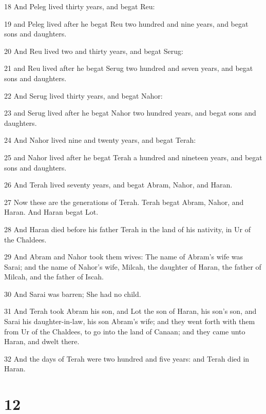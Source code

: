 \par 18 And Peleg lived thirty years, and begat Reu:
\par 19 and Peleg lived after he begat Reu two hundred and nine years, and begat sons and daughters.
\par 20 And Reu lived two and thirty years, and begat Serug:
\par 21 and Reu lived after he begat Serug two hundred and seven years, and begat sons and daughters.
\par 22 And Serug lived thirty years, and begat Nahor:
\par 23 and Serug lived after he begat Nahor two hundred years, and begat sons and daughters.
\par 24 And Nahor lived nine and twenty years, and begat Terah:
\par 25 and Nahor lived after he begat Terah a hundred and nineteen years, and begat sons and daughters.
\par 26 And Terah lived seventy years, and begat Abram, Nahor, and Haran.
\par 27 Now these are the generations of Terah. Terah begat Abram, Nahor, and Haran. And Haran begat Lot.
\par 28 And Haran died before his father Terah in the land of his nativity, in Ur of the Chaldees.
\par 29 And Abram and Nahor took them wives: The name of Abram's wife was Sarai; and the name of Nahor's wife, Milcah, the daughter of Haran, the father of Milcah, and the father of Iscah.
\par 30 And Sarai was barren; She had no child.
\par 31 And Terah took Abram his son, and Lot the son of Haran, his son's son, and Sarai his daughter-in-law, his son Abram's wife; and they went forth with them from Ur of the Chaldees, to go into the land of Canaan; and they came unto Haran, and dwelt there.
\par 32 And the days of Terah were two hundred and five years: and Terah died in Haran.

\chapter{12}

